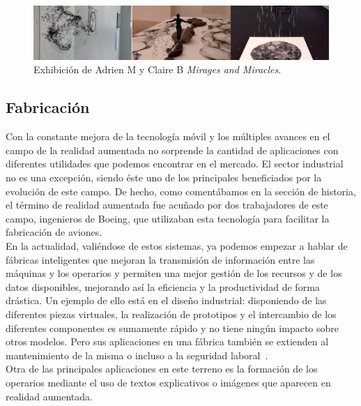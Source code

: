 \begin{figure}[H]
     \centering
     \includegraphics[width=\textwidth]{Images/AR-Art-Exhibition-Mirages-and-Miracles.png}
     \caption[Exhibición de Adrien M y Claire B \textit{Mirages and Miracles}]{Exhibición de Adrien M y Claire B \textit{Mirages and Miracles}\footnotemark.}
     \label{fig:Mirages and Miracles}
 \end{figure}

\subsection{Fabricación}
Con la constante mejora de la tecnología móvil y los múltiples avances en el campo de la realidad aumentada no sorprende la cantidad de aplicaciones con diferentes utilidades que podemos encontrar en el mercado. El sector industrial no es una excepción, siendo éste uno de los principales beneficiados por la evolución de este campo. De hecho, como comentábamos en la sección de historia, el término de realidad aumentada fue acuñado por dos trabajadores de este campo, ingenieros de Boeing, que utilizaban esta tecnología para facilitar la fabricación de aviones.\\

En la actualidad, valiéndose de estos sistemas, ya podemos empezar a hablar de fábricas inteligentes que mejoran la transmisión de información entre las máquinas y los operarios y permiten una mejor gestión de los recursos y de los datos disponibles, mejorando así la eficiencia y la productividad de forma drástica. Un ejemplo de ello está en el diseño industrial: disponiendo de las diferentes piezas virtuales, la realización de prototipos y el intercambio de los diferentes componentes es sumamente rápido y no tiene ningún impacto sobre otros modelos. Pero sus aplicaciones en una fábrica también se extienden al mantenimiento de la misma o incluso a la seguridad laboral~\cite{Neosentec_Fab}.\\ 

Otra de las principales aplicaciones en este terreno es la formación de los operarios mediante el uso de textos explicativos o imágenes que aparecen en realidad aumentada.\\


